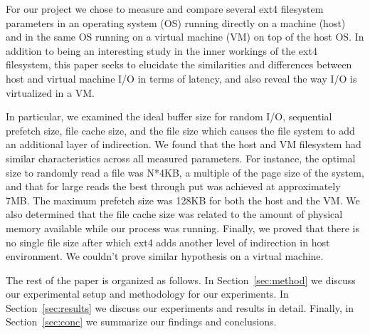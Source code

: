 For our project we chose to measure and compare several ext4 filesystem parameters
in an operating system (OS) running directly on a machine (host) and in the same 
OS running on a virtual machine (VM) on top of the host OS. In addition to being an 
interesting study in the inner workings of the ext4 filesystem, this paper seeks to
elucidate the similarities and differences between host and virtual machine I/O in
terms of latency, and also reveal the way I/O is virtualized in a VM.

In particular, we examined the ideal buffer size for random I/O, sequential 
prefetch size, file cache size, and the file size which causes the file system 
to add an additional layer of indirection. We found that the host and VM filesystem
had similar characteristics across all measured parameters. For instance, the 
optimal size to randomly read a file was N*4KB, a multiple of the page size of the 
system, and that for large reads the best through put was achieved at approximately
7MB. The maximum prefetch size was 128KB for both the host and the VM. We also 
determined that the file cache size was related to the amount of physical memory 
available while our process was running. Finally, we proved that there is no single file
size after which ext4 adds another level of indirection in host environment. We couldn't prove
similar hypothesis on a virtual machine.

The rest of the paper is organized as follows. In Section~\ref{sec:method} we 
discuss our experimental setup and methodology for our experiments. In 
Section~\ref{sec:results} we discuss our experiments and results in detail. 
Finally, in Section~\ref{sec:conc} we summarize our findings and conclusions.

